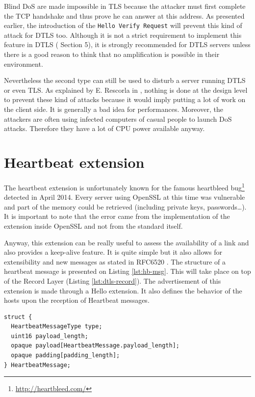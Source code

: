 Blind DoS are made impossible in TLS because the attacker must first complete the TCP handshake and thus prove he can answer at this address. As presented earlier, the introduction of the \texttt{Hello Verify Request} will prevent this kind of attack for DTLS too.  Although it is not a strict requirement to implement this feature in DTLS (\cite{rfc6347} Section 5), it is strongly recommended for DTLS servers  unless there is a good reason to think that no amplification is possible in their environment.

Nevertheless the second type can still be used to disturb a server running DTLS or even TLS. As explained by E. Rescorla in \cite{tls-dos}, nothing is done at the design level to prevent these kind of attacks because it would imply putting a lot of work on the client side. It is generally a bad idea for performances. Moreover, the attackers are often using infected computers of casual people to launch DoS attacks. Therefore they have a lot of CPU power available anyway.

\section{Heartbeat extension}

The heartbeat extension is unfortunately known for the famous heartbleed bug\footnote{\url{http://heartbleed.com/}} detected in April 2014. Every server using OpenSSL at this time was vulnerable and part of the memory could be retrieved (including private keys, passwords\dots). It is important to note that the error came from the implementation of the extension inside OpenSSL and not from the standard itself.

Anyway, this extension can be really useful to assess the availability of a link and also provides a keep-alive feature. It is quite simple but it also allows for extensibility and new messages as stated in RFC6520 \cite{rfc6520}. The structure of a heartbeat message is presented on Listing \ref{lst:hb-msg}. This will take place on top of the Record Layer (Listing \ref{lst:dtls-record}). The advertisement of this extension is made through a Hello extension. It also defines the behavior of the hosts upon the reception of Heartbeat messages.

\begin{lstlisting}[caption=Heartbeat message, label=lst:hb-msg]
struct {
  HeartbeatMessageType type;
  uint16 payload_length;
  opaque payload[HeartbeatMessage.payload_length];
  opaque padding[padding_length];
} HeartbeatMessage;
\end{lstlisting}

